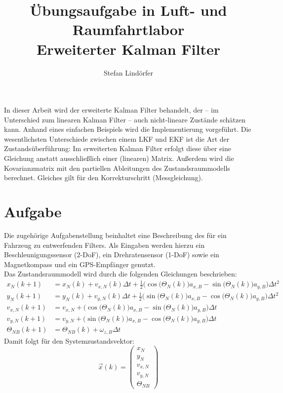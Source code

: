 \documentclass[12pt,a4paper]{article}
\begin{document}
	\title{Übungsaufgabe in Luft- und Raumfahrtlabor\\Erweiterter Kalman Filter}
	\author{Stefan Lindörfer}
	\maketitle{}
	
	In dieser Arbeit wird der erweiterte Kalman Filter behandelt, der -- im Unterschied zum linearen Kalman Filter -- auch nicht-lineare Zustände schätzen kann. Anhand eines einfachen Beispiels wird die Implementierung vorgeführt. Die wesentlichsten Unterschiede zwischen einem LKF und EKF ist die Art der Zustandsüberführung: Im erweiterten Kalman Filter erfolgt diese über eine Gleichung anstatt ausschließlich einer (linearen) Matrix. Außerdem wird die Kovarianzmatrix mit den partiellen Ableitungen des Zustandsraummodells berechnet. Gleiches gilt für den Korrekturschritt (Messgleichung).\\
	
	\section{Aufgabe}\label{sec:Aufgabe1}
	Die zugehörige Aufgabenstellung beinhaltet eine Beschreibung des für ein Fahrzeug zu entwerfenden Filters. Als Eingaben werden hierzu ein Beschleunigungssensor (2-DoF), ein Drehratensensor (1-DoF) sowie ein Magnetkompass und ein GPS-Empfänger genutzt.\\
	Das Zustandsraummodell wird durch die folgenden Gleichungen beschrieben:\\
	\begin{align}
		x_{N}(k+1)&=x_{N}(k)+v_{x,N}(k)\Delta t+\frac{1}{2}\bigg(\cos\big(\Theta_{N}(k)\big)a_{x,B}-\sin\big(\Theta_{N}(k)\big)a_{y,B}\bigg)\Delta t^{2}\label{eq:Zustand_x}\\
		y_{N}(k+1)&=y_{N}(k)+v_{y,N}(k)\Delta t+\frac{1}{2}\bigg(\sin\big(\Theta_{N}(k)\big)a_{x,B}-\cos\big(\Theta_{N}(k)\big)a_{y,B}\bigg)\Delta t^{2}\label{eq:Zustand_y}\\
		v_{x,N}(k+1)&=v_{x,N}+\bigg(\cos\big(\Theta_{N}(k)\big)a_{x,B}-\sin\big(\Theta_{N}(k)\big)a_{y,B}\bigg)\Delta t\label{eq:Zustand_vx}\\
		v_{y,N}(k+1)&=v_{y,N}+\bigg(\sin\big(\Theta_{N}(k)\big)a_{x,B}-\cos\big(\Theta_{N}(k)\big)a_{y,B}\bigg)\Delta t\label{eq:Zustand_vy}\\
		\Theta_{NB}(k+1)&=\Theta_{NB}(k)+\omega_{z,B}\Delta t\label{eq:Zustand_theta}
	\end{align}
	Damit folgt für den Systemzustandsvektor:
	\begin{equation}\label{eq:Zustandsraum}
		\vec{x}(k)=
			\begin{pmatrix}
			x_{N}\\
			y_{N}\\
			v_{x,N}\\
			v_{y,N}\\
			\Theta_{NB}
		\end{pmatrix}
	\end{equation}
\end{document}
